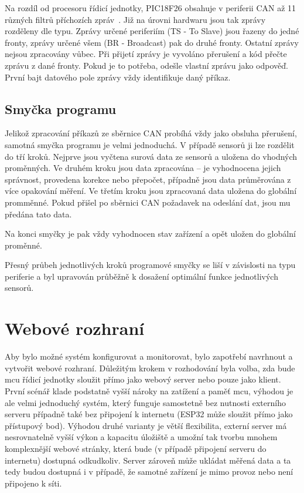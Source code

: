     Na rozdíl od procesoru řídicí jednotky, PIC18F26 obsahuje v periferii CAN až 11 různých filtrů příchozích zpráv~\cite{PIC18F26Q83}. Již na úrovni hardwaru jsou tak zprávy rozděleny dle typu. Zprávy určené periferiím (TS - To Slave) jsou řazeny do jedné fronty, zprávy určené všem (BR - Broadcast) pak do druhé fronty. Ostatní zprávy nejsou zpracovány vůbec. Při přijetí zprávy je vyvoláno přerušení a kód přečte zprávu z dané fronty. Pokud je to potřeba, odešle vlastní zprávu jako odpověď. První bajt datového pole zprávy vždy identifikuje daný příkaz. 

\subsection{Smyčka programu}
    Jelikož zpracování příkazů ze sběrnice CAN probíhá vždy jako obsluha přerušení, samotná smyčka programu je velmi jednoduchá.  V případě sensorů ji lze rozdělit do tří kroků. Nejprve jsou vyčtena surová data ze sensorů a uložena do vhodných proměnných. Ve druhém kroku jsou data zpracována -- je vyhodnocena jejich správnost, provedena korekce nebo přepočet, případně jsou data průměrována z více opakování měření. Ve třetím kroku jsou zpracovaná data uložena do globální promměnné. Pokud přišel po sběrnici CAN požadavek na odeslání dat, jsou mu předána tato data. 

    Na konci smyčky je pak vždy vyhodnocen stav zařízení a opět uložen do globální proměnné.

    Přesný průbeh jednotlivých kroků programové smyčky se liší v závislosti na typu periferie a byl upravován průběžně k dosažení optimální funkce jednotlivých sensorů.




\section{Webové rozhraní}
    Aby bylo možné systém konfigurovat a monitorovat, bylo zapotřebí navrhnout a vytvořit webové rozhraní. Důležitým krokem v rozhodování byla volba, zda bude \acs{mcu} řídicí jednotky sloužit přímo jako webový server nebo pouze jako klient. První scénář klade podstatně vyšší nároky na zatížení a paměť \acs{mcu}, výhodou je ale velmi jednoduchý systém, který funguje samostetně bez nutnosti externího serveru případně také bez připojení k internetu (ESP32 může sloužit přímo jako přístupový bod). Výhodou druhé varianty je větší flexibilita, externí server má nesrovnatelně vyšší výkon a kapacitu úložiště a umožní tak tvorbu mnohem komplexnější webové stránky, která bude (v případě připojení serveru do internetu) dostupná odkudkoliv. Server zároveň může ukládat měřená data a ta tedy budou dostupná i v případě, že samotné zařízení je mimo provoz nebo není připojeno k síti.

